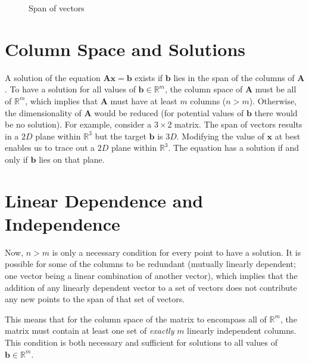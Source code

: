 \para

\begin{figure}[ht]
    \centering
    
    \caption{Span of vectors}
    \label{Vector span}
\end{figure}

\para

\section{Column Space and Solutions}

A solution of the equation \(\mathbf{A}\mathbf{x} = \mathbf{b}\) exists if \(\mathbf{b}\) lies in the span of the columns of \(\mathbf{A}\). To have a solution for all values of \(\mathbf{b} \in \mathbb{R}^{m}\), the column space of \(\mathbf{A}\) must be all of \(\mathbb{R}^{m}\), which implies that \(\mathbf{A}\) must have at least \(m\) columns (\(n > m\)). Otherwise, the dimensionality of \(\mathbf{A}\) would be reduced (for potential values of \(\mathbf{b}\) there would be no solution). For example, consider a \(3 \times 2\) matrix. The span of vectors results in a \(2D\) plane within \(\mathbb{R}^{3}\) but the target \(\mathbf{b}\) is \(3D\). Modifying the value of \(\mathbf{x}\) at best enables us to trace out a \(2D\) plane within \(\mathbb{R}^{3}\). The equation has a solution if and only if \(\mathbf{b}\) lies on that plane.

\clearpage
\newpage

\section{Linear Dependence and Independence}

Now, \(n > m\) is only a necessary condition for every point to have a solution. It is possible for some of the columns to be redundant (mutually linearly dependent; one vector being a linear combination of another vector), which implies that the addition of any linearly dependent vector to a set of vectors does not contribute any new points to the span of that set of vectors.

\para

This means that for the column space of the matrix to encompass all of \(\mathbb{R}^{m}\), the matrix must contain at least one set of \textit{exactly} \(m\) linearly independent columns. This condition is both necessary and sufficient for solutions to all values of \(\mathbf{b} \in \mathbb{R}^{m}\).

